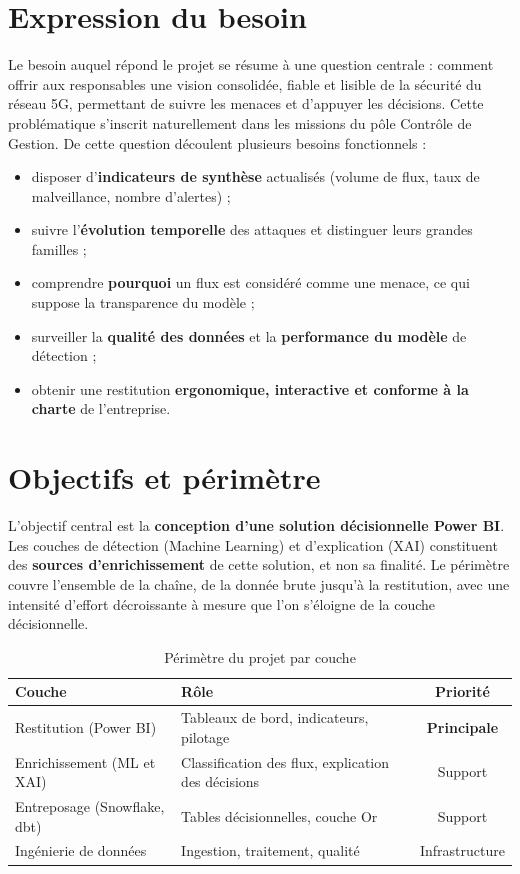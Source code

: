\documentclass[12pt,a4paper,oneside]{report}
\begin{document}
\section{Expression du besoin}
Le besoin auquel répond le projet se résume à une question centrale : comment offrir aux responsables une vision consolidée, fiable et lisible de la sécurité du réseau 5G, permettant de suivre les menaces et d'appuyer les décisions. Cette problématique s'inscrit naturellement dans les missions du pôle Contrôle de Gestion. De cette question découlent plusieurs besoins fonctionnels :

\begin{itemize}[leftmargin=1.4em]
  \item disposer d'\textbf{indicateurs de synthèse} actualisés (volume de flux, taux de malveillance, nombre d'alertes) ;
  \item suivre l'\textbf{évolution temporelle} des attaques et distinguer leurs grandes familles ;
  \item comprendre \textbf{pourquoi} un flux est considéré comme une menace, ce qui suppose la transparence du modèle ;
  \item surveiller la \textbf{qualité des données} et la \textbf{performance du modèle} de détection ;
  \item obtenir une restitution \textbf{ergonomique, interactive et conforme à la charte} de l'entreprise.
\end{itemize}

\section{Objectifs et périmètre}
L'objectif central est la \textbf{conception d'une solution décisionnelle Power BI}. Les couches de détection (Machine Learning) et d'explication (XAI) constituent des \textbf{sources d'enrichissement} de cette solution, et non sa finalité. Le périmètre couvre l'ensemble de la chaîne, de la donnée brute jusqu'à la restitution, avec une intensité d'effort décroissante à mesure que l'on s'éloigne de la couche décisionnelle.

\begin{table}[h]
\centering
\caption{Périmètre du projet par couche}
\begin{tabularx}{\textwidth}{lX c}
\toprule
\textbf{Couche} & \textbf{Rôle} & \textbf{Priorité} \\
\midrule
Restitution (Power BI) & Tableaux de bord, indicateurs, pilotage & \textbf{Principale} \\
Enrichissement (ML et XAI) & Classification des flux, explication des décisions & Support \\
Entreposage (Snowflake, dbt) & Tables décisionnelles, couche Or & Support \\
Ingénierie de données & Ingestion, traitement, qualité & Infrastructure \\
\bottomrule
\end{tabularx}
\end{table}
\end{document}
